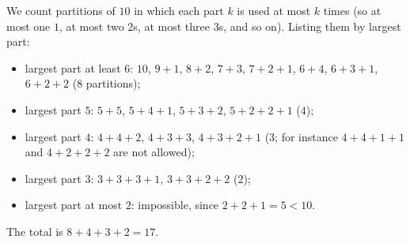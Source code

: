 We count partitions of $10$ in which each part $k$ is used at most $k$ times (so at most one $1$, at most two $2$s, at most three $3$s, and so on). Listing them by largest part:
\begin{itemize}
\item largest part at least $6$: $10$, $9+1$, $8+2$, $7+3$, $7+2+1$, $6+4$, $6+3+1$, $6+2+2$ ($8$ partitions);
\item largest part $5$: $5+5$, $5+4+1$, $5+3+2$, $5+2+2+1$ ($4$);
\item largest part $4$: $4+4+2$, $4+3+3$, $4+3+2+1$ ($3$; for instance $4+4+1+1$ and $4+2+2+2$ are not allowed);
\item largest part $3$: $3+3+3+1$, $3+3+2+2$ ($2$);
\item largest part at most $2$: impossible, since $2+2+1=5<10$.
\end{itemize}
The total is $8+4+3+2=\boxed{17}$.
